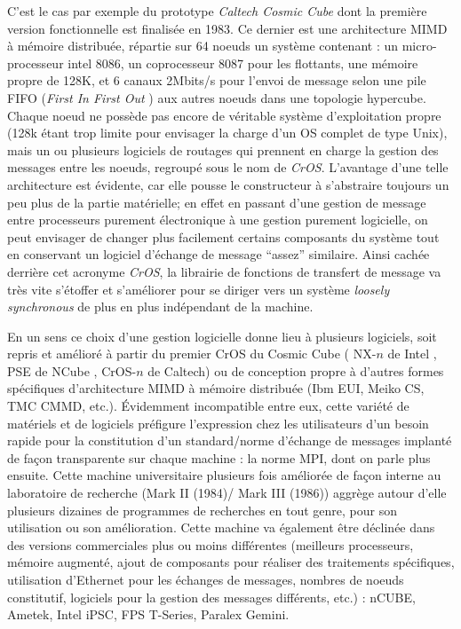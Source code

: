 C'est le cas par exemple du prototype \textit{Caltech Cosmic Cube} dont la première version fonctionnelle est finalisée en 1983. Ce dernier est une architecture MIMD à mémoire distribuée, répartie sur 64 noeuds un système contenant : un micro-processeur intel 8086, un coprocesseur 8087 pour les flottants, une mémoire propre de 128K, et 6 canaux 2Mbits/s pour l'envoi de message selon une pile FIFO (\textit{First In First Out} ) aux autres noeuds dans une topologie hypercube. Chaque noeud ne possède pas encore de véritable système d'exploitation propre (128k étant trop limite pour envisager la charge d'un OS complet de type Unix), mais un ou plusieurs logiciels de routages qui prennent en charge la gestion des messages entre les noeuds, regroupé sous le nom de \textit{CrOS}. L'avantage d'une telle architecture est évidente, car elle pousse le constructeur à s'abstraire toujours un peu plus de la partie matérielle; en effet en passant d'une gestion de message entre processeurs purement électronique à une gestion purement logicielle, on peut envisager de changer plus facilement certains composants du système tout en conservant un logiciel d'échange de message \enquote{assez} similaire. Ainsi cachée derrière cet acronyme \textit{CrOS}, la librairie de fonctions de transfert de message va très vite s'étoffer et s'améliorer pour se diriger vers un système \textit{loosely synchronous}  de plus en plus indépendant de la machine.  %

En un sens ce choix d'une gestion logicielle donne lieu à plusieurs logiciels, soit repris et amélioré à partir du premier CrOS du Cosmic Cube ( NX-$n$ de Intel , PSE de NCube , CrOS-$n$ de Caltech) ou de conception propre à d'autres formes spécifiques d'architecture MIMD à mémoire distribuée (Ibm EUI, Meiko CS, TMC CMMD, etc.). Évidemment incompatible entre eux, cette variété de matériels et de logiciels préfigure l'expression chez les utilisateurs d'un besoin rapide pour la constitution d'un standard/norme d'échange de messages implanté de façon transparente sur chaque machine : la norme MPI, dont on parle plus ensuite. Cette machine universitaire plusieurs fois améliorée de façon interne au laboratoire de recherche (Mark II (1984)/ Mark III (1986)) aggrège autour d'elle plusieurs dizaines de programmes de recherches en tout genre, pour son utilisation ou son amélioration. Cette machine va également être déclinée dans des versions commerciales plus ou moins différentes (meilleurs processeurs, mémoire augmenté, ajout de composants pour réaliser des traitements spécifiques, utilisation d'Ethernet pour les échanges de messages, nombres de noeuds constitutif, logiciels pour la gestion des messages différents, etc.) : nCUBE, Ametek, Intel iPSC, FPS T-Series, Paralex Gemini.

